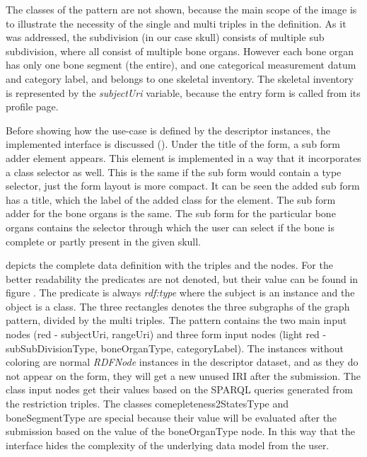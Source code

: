 
The classes of the pattern are not shown, because the main scope of the image is to illustrate the necessity of the single and multi triples in the definition. As it was addressed, the subdivision (in our case skull) consists of multiple sub subdivision, where all consist of multiple bone organs. However each bone organ has only one bone segment (the entire), and one categorical measurement datum and category label, and belongs to one skeletal inventory. The skeletal inventory is represented by the \textit{subjectUri} variable, because the entry form is called from its profile page.

Before showing how the use-case is defined by the descriptor instances, the implemented interface is discussed (). Under the title of the form, a sub form adder element appears. This element is implemented in a way that it incorporates a class selector as well. This is the same if the sub form would contain a type selector, just the form layout is more compact. It can be seen the added sub form has a title, which the label of the added class for the element. The sub form adder for the bone organs is the same. The sub form for the particular bone organs contains the selector through which the user can select if the bone is complete or partly present in the given skull.


 depicts the complete data definition with the triples and the nodes. For the better readability the predicates are not denoted, but their value can be found in figure . The predicate is always \textit{rdf:type} where the subject is an instance and the object is a class. The three rectangles denotes the three subgraphs of the graph pattern, divided by the multi triples. The pattern contains the two main input nodes (red - subjectUri, rangeUri) and three form input nodes (light red - subSubDivisionType, boneOrganType, categoryLabel). The instances without coloring are normal \textit{RDFNode} instances in the descriptor dataset, and as they do not appear on the form, they will get a new unused IRI after the submission. The class input nodes get their values based on the SPARQL queries generated from the restriction triples. The classes comepleteness2StatesType and boneSegmentType are special because their value will be evaluated after the submission based on the value of the boneOrganType node. In this way that the interface hides the complexity of the underlying data model from the user.

